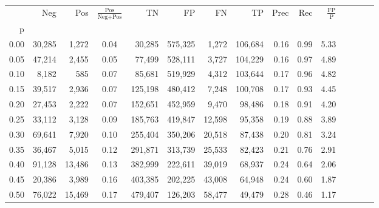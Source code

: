 \begin{tabular}{rrrcrrrrrrrrrrr}
\toprule
{} &     Neg &     Pos & $\frac{\text{Pos}}{\text{Neg}+\text{Pos}}$ &       TN &       FP &       FN &       TP &  Prec &   Rec & $\frac{\text{FP}}{\text{P}}$ \\
p    &         &         &                                            &          &          &          &          &       &       &                              \\
\midrule
0.00 &  30,285 &   1,272 &                                       0.04 &   30,285 &  575,325 &    1,272 &  106,684 &  0.16 &  0.99 &                         5.33 \\
0.05 &  47,214 &   2,455 &                                       0.05 &   77,499 &  528,111 &    3,727 &  104,229 &  0.16 &  0.97 &                         4.89 \\
0.10 &   8,182 &     585 &                                       0.07 &   85,681 &  519,929 &    4,312 &  103,644 &  0.17 &  0.96 &                         4.82 \\
0.15 &  39,517 &   2,936 &                                       0.07 &  125,198 &  480,412 &    7,248 &  100,708 &  0.17 &  0.93 &                         4.45 \\
0.20 &  27,453 &   2,222 &                                       0.07 &  152,651 &  452,959 &    9,470 &   98,486 &  0.18 &  0.91 &                         4.20 \\
0.25 &  33,112 &   3,128 &                                       0.09 &  185,763 &  419,847 &   12,598 &   95,358 &  0.19 &  0.88 &                         3.89 \\
0.30 &  69,641 &   7,920 &                                       0.10 &  255,404 &  350,206 &   20,518 &   87,438 &  0.20 &  0.81 &                         3.24 \\
0.35 &  36,467 &   5,015 &                                       0.12 &  291,871 &  313,739 &   25,533 &   82,423 &  0.21 &  0.76 &                         2.91 \\
0.40 &  91,128 &  13,486 &                                       0.13 &  382,999 &  222,611 &   39,019 &   68,937 &  0.24 &  0.64 &                         2.06 \\
0.45 &  20,386 &   3,989 &                                       0.16 &  403,385 &  202,225 &   43,008 &   64,948 &  0.24 &  0.60 &                         1.87 \\
0.50 &  76,022 &  15,469 &                                       0.17 &  479,407 &  126,203 &   58,477 &   49,479 &  0.28 &  0.46 &                         1.17 \\

\end{tabular}

